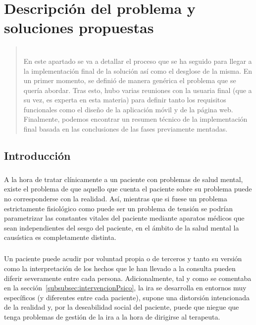 %
%

\chapter{Descripción del problema y soluciones propuestas}

\begin{quotation}\noindent\begin{small}\textbf{} \\
En este apartado se va a detallar el proceso que se ha seguido para llegar a la implementación final de la solución así como el desglose de la misma. En un primer momento, se definió de manera genérica el problema que se quería abordar. Tras esto, hubo varias reuniones con la usuaria final (que a su vez, es experta en esta materia) para definir tanto los requisitos funcionales como el diseño de la aplicación móvil y de la página web. Finalmente, podemos encontrar un resumen técnico de la implementación final basada en las conclusiones de las fases previamente mentadas.
\end{small}\end{quotation}


\section{Introducción}
\paragraph{}
A la hora de tratar clínicamente a un paciente con problemas de salud mental, existe el problema de que aquello que cuenta el paciente sobre su problema puede no corresponderse con la realidad. Así, mientras que si fuese un problema estrictamente fisiológico como puede ser un problema de tensión se podrían parametrizar las constantes vitales del paciente mediante aparatos médicos que sean independientes del sesgo del paciente, en el ámbito de la salud mental la causística es completamente distinta.

\paragraph{}
Un paciente puede acudir por voluntad propia o de terceros y tanto su versión como la interpretación de los hechos que le han llevado a la consulta pueden diferir severamente entre cada persona. Adicionalmente, tal y como se comentaba en la sección~\ref{subsubsec:intervencionPsico}, la ira se desarrolla en entornos muy específicos (y diferentes entre cada paciente), supone una distorsión intencionada de la realidad y, por la deseabilidad social del paciente, puede que niegue que tenga problemas de gestión de la ira a la hora de dirigirse al terapeuta.

